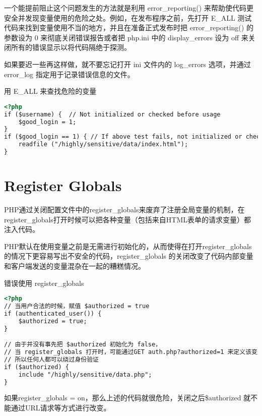一个能提前阻止这个问题发生的方法就是利用 error\_reporting() 来帮助使代码更安全并发现变量使用的危险之处。例如，在发布程序之前，先打开 E\_ALL 测试代码来找到变量使用不当的地方，并且在准备正式发布时把 error\_reporting() 的参数设为 0 来彻底关闭错误报告或者把 php.ini 中的 display\_errors 设为 off 来关闭所有的错误显示以将代码隔绝于探测。

如果要迟一些再这样做，就不要忘记打开 ini 文件内的 log\_errors 选项，并通过 error\_log 指定用于记录错误信息的文件。


\begin{example}
用 E\_ALL 来查找危险的变量
\begin{lstlisting}[language=HTML]
<?php
if ($username) {  // Not initialized or checked before usage
    $good_login = 1;
}
if ($good_login == 1) { // If above test fails, not initialized or checked before usage
    readfile ("/highly/sensitive/data/index.html");
}
\end{lstlisting}
\end{example}

\section{Register Globals}

PHP通过关闭配置文件中的register\_globals来废弃了注册全局变量的机制，在register\_globals打开时候可以把各种变量（包括来自HTML表单的请求变量）都注入代码。

PHP默认在使用变量之前是无需进行初始化的，从而使得在打开register\_globals的情况下更容易写出不安全的代码，register\_globals 的关闭改变了代码内部变量和客户端发送的变量混杂在一起的糟糕情况。



\begin{example}
错误使用 register\_globals
\begin{lstlisting}[language=HTML]
<?php
// 当用户合法的时候，赋值 $authorized = true
if (authenticated_user()) {
    $authorized = true;
}

// 由于并没有事先把 $authorized 初始化为 false，
// 当 register_globals 打开时，可能通过GET auth.php?authorized=1 来定义该变量值
// 所以任何人都可以绕过身份验证
if ($authorized) {
    include "/highly/sensitive/data.php";
}
\end{lstlisting}
\end{example}



如果register\_globals = on，那么上述的代码就很危险，关闭之后\$authorized 就不能通过URL请求等方式进行改变。

